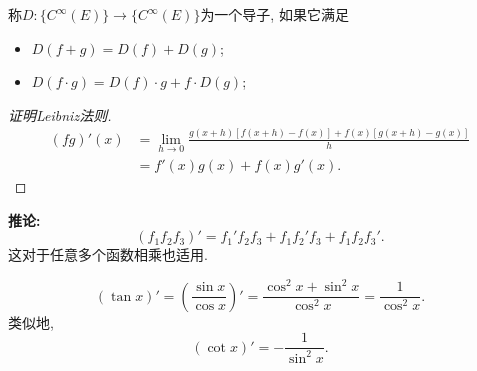 \begin{definition}
    称$D\colon \{ C^{\infty}\left( E \right)  \} \to  \{ C^{\infty}\left( E \right)  \}$为一个导子, 如果它满足
    \begin{itemize}
        \item $D\left( f+g \right) = D\left( f \right) + D\left( g \right) $;
        \item $D\left( f \cdot g \right) = D\left( f \right) \cdot g + f \cdot D\left( g \right) $;
    \end{itemize}
\end{definition}

\begin{proof}[证明Leibniz法则]
    \begin{equation}
        \begin{aligned}
            \left( fg \right) ' \left( x \right)  & = \lim_{h \to 0} \frac{g\left( x+h \right) \left[ f\left( x+h \right) - f\left( x \right)  \right] + f\left( x \right) \left[ g\left( x+h \right) -g\left( x \right)  \right] }{h}
            \\ 
            & = f'\left( x \right) g\left( x \right) + f\left( x \right) g'\left( x \right) .
        \end{aligned}
    \end{equation}
\end{proof}

\noindent
\textbf{推论: }
\begin{equation}
  \left( f_1f_2f_3 \right) ' = f_1'f_2f_3 + f_1f_2'f_3 + f_1f_2f_3'.
\end{equation} 
这对于任意多个函数相乘也适用.

\begin{example}
    \begin{equation}
      \left( \tan x \right) ' = \left( \frac{\sin x}{\cos x} \right) ' = \frac{\cos^{2} x + \sin^{2} x}{\cos^{2} x} = \frac{1}{\cos^{2} x}.
    \end{equation}
    类似地, 
    \begin{equation}
        \left( \cot x \right) ' = - \frac{1}{\sin^{2} x}.
    \end{equation}
\end{example}

